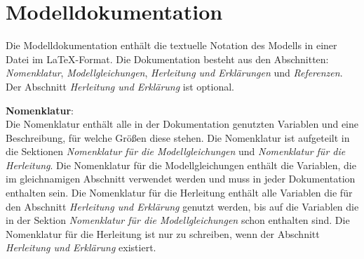 \section{Modelldokumentation}
\label{Ch:Ergebnisse:Sec:Dokumentation}
Die Modelldokumentation enthält die textuelle Notation des Modells in einer Datei im \LaTeX-Format. Die Dokumentation besteht aus den Abschnitten: \textit{Nomenklatur}, \textit{Modellgleichungen}, \textit{Herleitung und Erklärungen} und \textit{Referenzen}. Der Abschnitt \textit{Herleitung und Erklärung} ist optional.

\textbf{Nomenklatur}:\\
Die Nomenklatur enthält alle in der Dokumentation genutzten Variablen und eine Beschreibung, für welche Größen diese stehen. Die Nomenklatur ist aufgeteilt in die Sektionen \textit{Nomenklatur für die Modellgleichungen} und \textit{Nomenklatur für die Herleitung}. Die Nomenklatur für die Modellgleichungen enthält die Variablen, die im gleichnamigen Abschnitt verwendet werden und muss in jeder Dokumentation enthalten sein. Die Nomenklatur für die Herleitung enthält alle Variablen die für den Abschnitt \textit{Herleitung und Erklärung} genutzt werden, bis auf die Variablen die in der Sektion \textit{Nomenklatur für die Modellgleichungen} schon enthalten sind. Die Nomenklatur für die Herleitung ist nur zu schreiben, wenn der Abschnitt \textit{Herleitung und Erklärung} existiert.

